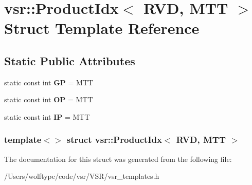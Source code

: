 \hypertarget{structvsr_1_1_product_idx_3_01_r_v_d_00_01_m_t_t_01_4}{\section{vsr\-:\-:Product\-Idx$<$ R\-V\-D, M\-T\-T $>$ Struct Template Reference}
\label{structvsr_1_1_product_idx_3_01_r_v_d_00_01_m_t_t_01_4}
}
\subsection*{Static Public Attributes}
\begin{DoxyCompactItemize}
\item 
\hypertarget{structvsr_1_1_product_idx_3_01_r_v_d_00_01_m_t_t_01_4_a6d78625f19400b0a90f38a9305777a9a}{static const int {\bfseries G\-P} = M\-T\-T}\label{structvsr_1_1_product_idx_3_01_r_v_d_00_01_m_t_t_01_4_a6d78625f19400b0a90f38a9305777a9a}

\item 
\hypertarget{structvsr_1_1_product_idx_3_01_r_v_d_00_01_m_t_t_01_4_a4113c5b7735fae8ee1c4d3ae8e9c9bc8}{static const int {\bfseries O\-P} = M\-T\-T}\label{structvsr_1_1_product_idx_3_01_r_v_d_00_01_m_t_t_01_4_a4113c5b7735fae8ee1c4d3ae8e9c9bc8}

\item 
\hypertarget{structvsr_1_1_product_idx_3_01_r_v_d_00_01_m_t_t_01_4_a973a33bbd891d25a9b1aa25cc6176034}{static const int {\bfseries I\-P} = M\-T\-T}\label{structvsr_1_1_product_idx_3_01_r_v_d_00_01_m_t_t_01_4_a973a33bbd891d25a9b1aa25cc6176034}

\end{DoxyCompactItemize}
\subsubsection*{template$<$$>$ struct vsr\-::\-Product\-Idx$<$ R\-V\-D, M\-T\-T $>$}



The documentation for this struct was generated from the following file\-:\begin{DoxyCompactItemize}
\item 
/\-Users/wolftype/code/vsr/\-V\-S\-R/vsr\-\_\-templates.\-h\end{DoxyCompactItemize}
